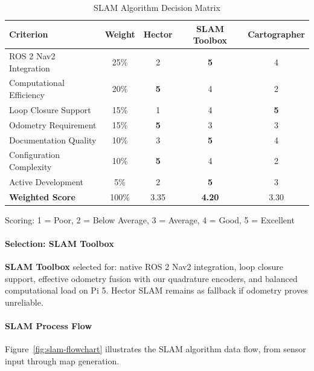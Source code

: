 \begin{table}[H]
\centering
\caption{SLAM Algorithm Decision Matrix}
\label{tab:slam-decision}
\begin{tabular}{@{}lcccc@{}}
\toprule
\textbf{Criterion} & \textbf{Weight} & \textbf{Hector} & \textbf{SLAM Toolbox} & \textbf{Cartographer} \\
\midrule
ROS 2 Nav2 Integration & 25\% & 2 & \textbf{5} & 4 \\
Computational Efficiency & 20\% & \textbf{5} & 4 & 2 \\
Loop Closure Support & 15\% & 1 & 4 & \textbf{5} \\
Odometry Requirement & 15\% & \textbf{5} & 3 & 3 \\
Documentation Quality & 10\% & 3 & \textbf{5} & 4 \\
Configuration Complexity & 10\% & \textbf{5} & 4 & 2 \\
Active Development & 5\% & 2 & \textbf{5} & 3 \\
\midrule
\textbf{Weighted Score} & 100\% & 3.35 & \textbf{4.20} & 3.30 \\
\bottomrule
\end{tabular}

\footnotesize{Scoring: 1 = Poor, 2 = Below Average, 3 = Average, 4 = Good, 5 = Excellent}
\end{table}

\paragraph{Selection: SLAM Toolbox}

\textbf{SLAM Toolbox} selected for: native ROS 2 Nav2 integration, loop closure support, effective odometry fusion with our quadrature encoders, and balanced computational load on Pi 5. Hector SLAM remains as fallback if odometry proves unreliable.

\paragraph{SLAM Process Flow}

Figure~\ref{fig:slam-flowchart} illustrates the SLAM algorithm data flow, from sensor input through map generation.

